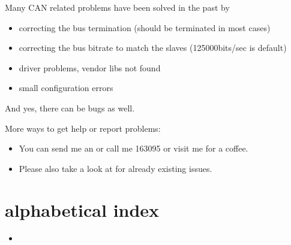 \documentclass[a4paper,10pt,english]{sphinxmanual}
\begin{document}
\sphinxAtStartPar
Many CAN related problems have been solved in the past by
\begin{itemize}
\item {} 
\sphinxAtStartPar
correcting the bus termination (should be terminated in most cases)

\item {} 
\sphinxAtStartPar
correcting the bus bitrate to match the slaves (125000bits/sec is default)

\item {} 
\sphinxAtStartPar
driver problems, vendor libs not found

\item {} 
\sphinxAtStartPar
small configuration errors

\end{itemize}

\sphinxAtStartPar
And yes, there can be bugs as well.

\sphinxAtStartPar
More  ways to get help or report problems:
\begin{itemize}
\item {} 
\sphinxAtStartPar
You can send me an  or call me 163095 or visit me for a coffee.

\item {} 
\sphinxAtStartPar
Please also take a look at  for already existing issues.

\end{itemize}


\chapter{alphabetical index}
\label{\detokenize{index:alphabetical-index}}\begin{itemize}
\item {} 
\sphinxAtStartPar
{}

\end{itemize}



\renewcommand{\indexname}{Index}
\printindex
\end{document}
